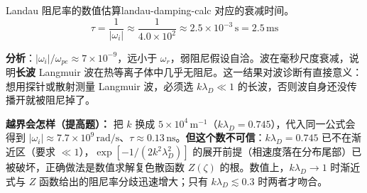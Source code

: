 \begin{example}{Landau 阻尼率的数值估算}{landau-damping-calc}
对应的衰减时间。
\[
\tau = \frac{1}{|\omega_i|} \approx \frac{1}{4.0\times 10^{2}} \approx 2.5\times 10^{-3}\,\mathrm{s} = 2.5\,\mathrm{ms}
\]

\textbf{分析}：$|\omega_i|/\omega_{pe}\approx7\times10^{-9}$，远小于 $\omega_r$，弱阻尼假设自洽。波在毫秒尺度衰减，说明\textbf{长波} \mbox{Langmuir} 波在热等离子体中几乎无阻尼。这一结果对波诊断有直接意义：想用探针或散射测量 \mbox{Langmuir} 波，必须选 $k\lambda_D\ll1$ 的长波，否则波自身还没传播开就被阻尼掉了。

\textbf{越界会怎样（提高题）：} 把 $k$ 换成 $5\times10^{4}\,\mathrm{m^{-1}}$（$k\lambda_D=0.745$），代入同一公式会得到 $|\omega_i|\approx7.7\times10^{9}\,\mathrm{rad/s}$、$\tau\approx0.13\,\mathrm{ns}$。\textbf{但这个数不可信}：$k\lambda_D=0.745$ 已不在渐近区（要求 $\ll1$），$\exp[-1/(2k^2\lambda_D^2)]$ 的展开前提（相速度落在分布尾部）已被破坏，正确做法是数值求解复色散函数 $Z(\zeta)$ 的根。数值上，$k\lambda_D\to1$ 时渐近式与 $Z$ 函数给出的阻尼率分歧迅速增大；只有 $k\lambda_D\lesssim0.3$ 时两者才吻合。
\end{example}

